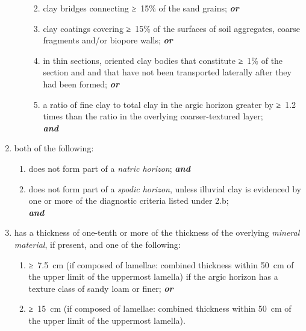 \documentclass[
  letterpaper,
  DIV=11,
  numbers=noendperiod]{scrreprt}
\providecommand{\tightlist}{%
  \setlength{\itemsep}{0pt}\setlength{\parskip}{0pt}}\usepackage{longtable,booktabs,array}
\begin{document}
\begin{enumerate}
\begin{enumerate}
    \begin{enumerate}
    \def\labelenumiii{\roman{enumiii}.}
    \tightlist
    \item
      clay bridges connecting ≥~15\% of the sand grains;
      \textbf{\emph{or}}
    \item
      clay coatings covering ≥~15\% of the surfaces of soil aggregates,
      coarse fragments and/or biopore walls; \textbf{\emph{or}}
    \item
      in thin sections, oriented clay bodies that constitute ≥~1\% of
      the section and and that have not been transported laterally after
      they had been formed; \textbf{\emph{or}}
    \item
      a ratio of fine clay to total clay in the argic horizon greater by
      ≥~1.2 times than the ratio in the overlying coarser-textured
      layer;\\
      \textbf{\emph{and}}
    \end{enumerate}
  \end{enumerate}
\item
  both of the following:

  \begin{enumerate}
  \def\labelenumii{\alph{enumii}.}
  \tightlist
  \item
    does not form part of a \emph{natric horizon}; \textbf{\emph{and}}
  \item
    does not form part of a \emph{spodic horizon}, unless illuvial clay
    is evidenced by one or more of the diagnostic criteria listed under
    2.b;\\
    \textbf{\emph{and}}
  \end{enumerate}
\item
  has a thickness of one-tenth or more of the thickness of the overlying
  \emph{mineral material}, if present, and one of the following:

  \begin{enumerate}
  \def\labelenumii{\alph{enumii}.}
  \tightlist
  \item
    ≥~7.5~cm (if composed of lamellae: combined thickness within 50~cm
    of the upper limit of the uppermost lamella) if the argic horizon
    has a texture class of sandy loam or finer; \textbf{\emph{or}}
  \item
    ≥~15~cm (if composed of lamellae: combined thickness within 50~cm of
    the upper limit of the uppermost lamella).
  \end{enumerate}
\end{enumerate}
\end{document}
